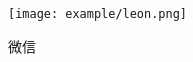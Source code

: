 
\begin{pre}
	\thispagestyle{empty}
	\begin{center}
		{}
	\end{center}

\vspace*{5\baselineskip}
\centerline{\texttt{[image: example/leon.png]}}
\centerline{\fontsize{26pt}{26pt} 微信}
\end{pre}